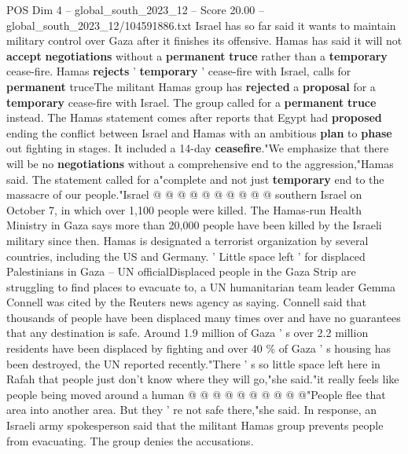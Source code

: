 \begin{textsample}{POS Dim 4 – global\_south\_2023\_12 – Score 20.00 – global\_south\_2023\_12/104591886.txt}
Israel has so far said it wants to maintain military control over Gaza after it finishes its offensive.
Hamas has said it will not \textbf{accept} \textbf{negotiations} without a \textbf{permanent} \textbf{truce} rather than a \textbf{temporary} cease-fire.
Hamas \textbf{rejects} ' \textbf{temporary} ' cease-fire with Israel, calls for \textbf{permanent} truceThe militant Hamas group has \textbf{rejected} a \textbf{proposal} for a \textbf{temporary} cease-fire with Israel.
The group called for a \textbf{permanent} \textbf{truce} instead.
The Hamas statement comes after reports that Egypt had \textbf{proposed} ending the conflict between Israel and Hamas with an ambitious \textbf{plan} to \textbf{phase} out fighting in stages.
It included a 14-day \textbf{ceasefire}."We emphasize that there will be no \textbf{negotiations} without a comprehensive end to the aggression,"Hamas said.
The statement called for a"complete and not just \textbf{temporary} end to the massacre of our people."Israel @ @ @ @ @ @ @ @ @ @ southern Israel on October 7, in which over 1,100 people were killed.
The Hamas-run Health Ministry in Gaza says more than 20,000 people have been killed by the Israeli military since then.
Hamas is designated a terrorist organization by several countries, including the US and Germany. ' Little space left ' for displaced Palestinians in Gaza -- UN officialDisplaced people in the Gaza Strip are struggling to find places to evacuate to, a UN humanitarian team leader Gemma Connell was cited by the Reuters news agency as saying.
Connell said that thousands of people have been displaced many times over and have no guarantees that any destination is safe.
Around 1.9 million of Gaza ' s over 2.2 million residents have been displaced by fighting and over 40 \% of Gaza ' s housing has been destroyed, the UN reported recently."There ' s so little space left here in Rafah that people just don't know where they will go,"she said."it really feels like people being moved around a human @ @ @ @ @ @ @ @ @ @"People flee that area into another area.
But they ' re not safe there,"she said.
In response, an Israeli army spokesperson said that the militant Hamas group prevents people from evacuating.
The group denies the accusations.

\end{textsample}
